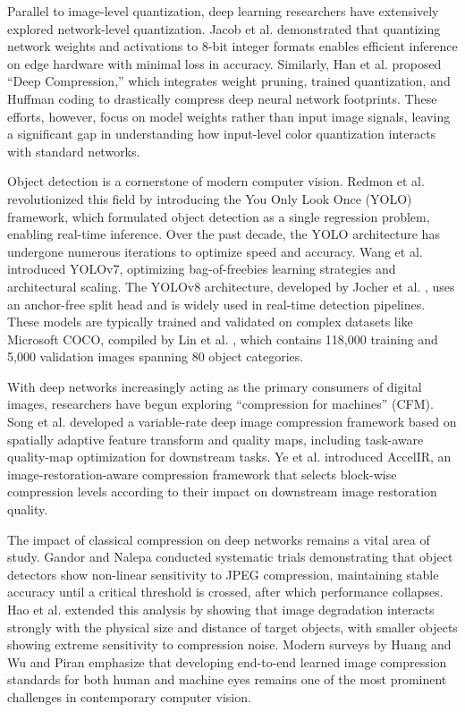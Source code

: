 \documentclass[12pt, a4paper]{article}
\begin{document}
Parallel to image-level quantization, deep learning researchers have extensively explored network-level quantization. Jacob et al. \cite{jacob2018} demonstrated that quantizing network weights and activations to 8-bit integer formats enables efficient inference on edge hardware with minimal loss in accuracy. Similarly, Han et al. \cite{han2016} proposed ``Deep Compression,'' which integrates weight pruning, trained quantization, and Huffman coding to drastically compress deep neural network footprints. These efforts, however, focus on model weights rather than input image signals, leaving a significant gap in understanding how input-level color quantization interacts with standard networks.

Object detection is a cornerstone of modern computer vision. Redmon et al. \cite{redmon2016} revolutionized this field by introducing the You Only Look Once (YOLO) framework, which formulated object detection as a single regression problem, enabling real-time inference. Over the past decade, the YOLO architecture has undergone numerous iterations to optimize speed and accuracy. Wang et al. \cite{wang2023} introduced YOLOv7, optimizing bag-of-freebies learning strategies and architectural scaling. The YOLOv8 architecture, developed by Jocher et al. \cite{jocher2023}, uses an anchor-free split head and is widely used in real-time detection pipelines. These models are typically trained and validated on complex datasets like Microsoft COCO, compiled by Lin et al. \cite{lin2014}, which contains 118,000 training and 5,000 validation images spanning 80 object categories.

With deep networks increasingly acting as the primary consumers of digital images, researchers have begun exploring ``compression for machines'' (CFM). Song et al. \cite{song2021} developed a variable-rate deep image compression framework based on spatially adaptive feature transform and quality maps, including task-aware quality-map optimization for downstream tasks. Ye et al. \cite{ye2023} introduced AccelIR, an image-restoration-aware compression framework that selects block-wise compression levels according to their impact on downstream image restoration quality.

The impact of classical compression on deep networks remains a vital area of study. Gandor and Nalepa \cite{gandor2022} conducted systematic trials demonstrating that object detectors show non-linear sensitivity to JPEG compression, maintaining stable accuracy until a critical threshold is crossed, after which performance collapses. Hao et al. \cite{hao2022} extended this analysis by showing that image degradation interacts strongly with the physical size and distance of target objects, with smaller objects showing extreme sensitivity to compression noise. Modern surveys by Huang and Wu \cite{huang2024} and Piran \cite{piran2022} emphasize that developing end-to-end learned image compression standards for both human and machine eyes remains one of the most prominent challenges in contemporary computer vision.
\end{document}
